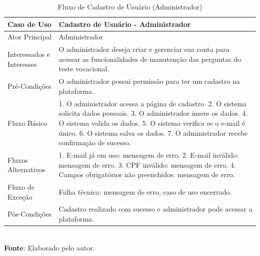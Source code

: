 \begin{table}[h!]
\centering
\caption{Fluxo de Cadastro de Usuário (Administrador)}
\begin{tabular}{|m{4cm}|m{11cm}|}
\hline
\textbf{Caso de Uso}   & \textbf{Cadastro de Usuário - Administrador} \\
\hline
Ator Principal & Administrador\\
\hline
Interessados e Interesses & O administrador deseja criar e gerenciar sua conta para acessar as funcionalidades de manutenção das perguntas do teste vocacional. \\
\hline
Pré-Condições & O administrador possui permissão para ter um cadastro na plataforma. \\
\hline
Fluxo Básico & 

1. O administrador acessa a página de cadastro.
2. O sistema solicita dados pessoais.
3. O administrador insere os dados.
4. O sistema valida os dados.
5. O sistema verifica se o e-mail é único.
6. O sistema salva os dados.
7. O administrador recebe confirmação de sucesso.\\
\hline
Fluxos Alternativos & 

1. E-mail já em uso: mensagem de erro.
2. E-mail inválido: mensagem de erro.
3. CPF inválido: mensagem de erro.
4. Campos obrigatórios não preenchidos: mensagem de erro.
\\
\hline
Fluxo de Exceção & Falha técnica: mensagem de erro, caso de uso encerrado. \\
\hline
Pós-Condições & Cadastro realizado com sucesso e administrador pode acessar a plataforma. \\
\hline
\end{tabular}
\label{table:casos-de-uso}
\\[1ex]
\footnotesize \textbf{Fonte}: Elaborado pelo autor.
\end{table}



